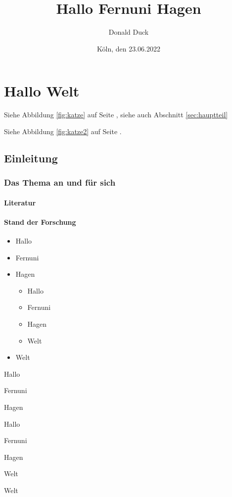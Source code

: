 \documentclass[12pt,ngerman,parskip=half]{scrreprt}
\author{Donald Duck}
\title{Hallo Fernuni Hagen}
\date{Köln, den 23.06.2022}
\begin{document}
\maketitle

\tableofcontents

\listoffigures

\listoftables

\chapter{Hallo Welt}

Siehe Abbildung \ref{fig:katze} auf Seite \pageref{fig:katze}, siehe auch Abschnitt \ref{sec:hauptteil}

Siehe Abbildung \ref{fig:katze2} auf Seite \pageref{fig:katze2}.

\section{Einleitung}
\subsection{Das Thema an und für sich}
\subsubsection{Literatur}

\blindtext[2] 

\subsubsection{Stand der Forschung}

\blindtext[1] 


\begin{itemize} %
\item Hallo
\item Fernuni
\item Hagen
\begin{itemize}[+]
\item Hallo
\item Fernuni
\item Hagen
\item Welt
\end{itemize}
\item Welt
\end{itemize}

\begin{compactitem}[\%] %
\item Hallo
\item Fernuni
\item Hagen
\begin{compactitem}[+]
\item Hallo
\item Fernuni
\item Hagen
\item Welt
\end{compactitem}
\item Welt
\end{compactitem}
\end{document}
